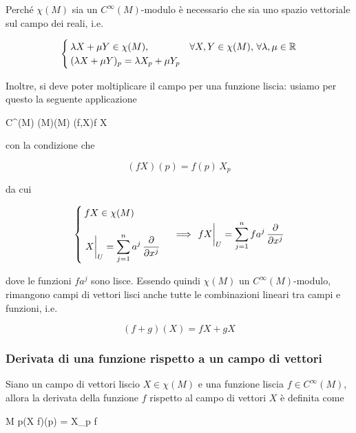 Perché $ \chi(M) $ sia un $ C^{\infty}(M) $-modulo è necessario che sia uno spazio vettoriale sul campo dei reali, i.e.

\begin{equation}
	\begin{cases}
		\lambda X + \mu Y \in \chi(M), & \forall X,Y \in \chi(M), \, \forall \lambda,\mu \in \mathbb{R} \\
		(\lambda X + \mu Y)_{p} = \lambda X_{p} + \mu Y_{p}
	\end{cases}
\end{equation}

Inoltre, si deve poter moltiplicare il campo per una funzione liscia: usiamo per questo la seguente applicazione

	{C^{\infty}(M) \times \chi(M)}{\chi(M)}
	{(f,X)}{f X}

con la condizione che

\begin{equation}
	(f X)(p) = f(p) \, X_{p}
\end{equation}

da cui

\begin{equation}
	\begin{cases}
		f X \in \chi(M) \\ \\
		\displaystyle \eval{X}_{U} = \sum_{j=1}^{n} a^{j} \, \pdv{x^{j}}
	\end{cases} %
	\implies %
	\eval{f X}_{U} = \sum_{j=1}^{n} f a^{j} \, \pdv{x^{j}}
\end{equation}

dove le funzioni $ f a^{j} $ sono lisce. Essendo quindi $ \chi(M) $ un $ C^{\infty}(M) $-modulo, rimangono campi di vettori lisci anche tutte le combinazioni lineari tra campi e funzioni, i.e.

\begin{equation}
	(f+g)(X) = f X + g X
\end{equation}

\subsubsection{Derivata di una funzione rispetto a un campo di vettori}

Siano un campo di vettori liscio $ X \in \chi(M) $ e una funzione liscia $ f \in C^{\infty}(M) $, allora la derivata della funzione $ f $ rispetto al campo di vettori $ X $ è definita come

	{M}{\R}
	{p}{(X f)(p) = X_{p} f}

